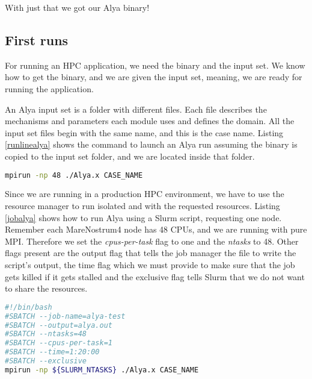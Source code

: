 With just that we got our Alya binary!

\subsection{First runs}

For running an HPC application, we need the binary and the input set. We know how to get the binary, and we are given the input set, meaning, we are ready for running the application.

An Alya input set is a folder with different files. Each file describes the mechanisms and parameters each module uses and defines the domain. All the input set files begin with the same name, and this is the case name. Listing \ref{runlinealya} shows the command to launch an Alya run assuming the binary is copied to the input set folder, and we are located inside that folder.

\begin{lstlisting}[language=sh, caption={Running Alya with 48 processes.}, label={runlinealya}]
mpirun -np 48 ./Alya.x CASE_NAME
\end{lstlisting}


Since we are running in a production HPC environment, we have to use the resource manager to run isolated and with the requested resources. Listing \ref{jobalya} shows how to run Alya using a Slurm script, requesting one node. Remember each MareNostrum4 node has 48 CPUs, and we are running with pure MPI. Therefore we set the \textit{cpus-per-task} flag to one and the \textit{ntasks} to 48. Other flags present are the output flag that tells the job manager the file to write the script's output, the time flag which we must provide to make sure that the job gets killed if it gets stalled and the exclusive flag tells Slurm that we do not want to share the resources.

\begin{lstlisting}[language=sh, caption={Running Alya with SLURM.}, label={jobalya}]
#!/bin/bash
#SBATCH --job-name=alya-test
#SBATCH --output=alya.out
#SBATCH --ntasks=48
#SBATCH --cpus-per-task=1
#SBATCH --time=1:20:00
#SBATCH --exclusive
mpirun -np ${SLURM_NTASKS} ./Alya.x CASE_NAME
\end{lstlisting}

